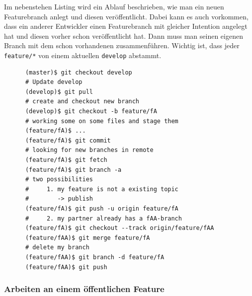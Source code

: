 \documentclass[
   draft=false
  ,paper=a4
  ,twoside=false
  ,fontsize=11pt
  ,headsepline
  ,DIV=11
  ,parskip=full+
  ,titlepage
]{scrartcl} %
\begin{document}
    
  \begin{minipage}[t]{0.25\linewidth}
	  Im nebenstehen Listing wird ein Ablauf
    beschrieben, wie man ein neuen Featurebranch anlegt und 
    diesen veröffentlicht.
    Dabei kann es auch vorkommen, dass ein anderer Entwickler einen
    Featurebranch mit gleicher Intention angelegt hat und diesen vorher 
    schon veröffentlicht hat. Dann muss man seinen eigenen Branch
    mit dem schon vorhandenen zusammenführen.
    Wichtig ist, dass jeder \texttt{feature/*} von einem aktuellen 
    \texttt{develop} abstammt. 
  \end{minipage}%
  \hfill
  \begin{minipage}[t]{0.65\linewidth}
    \begin{lstlisting}
      (master)$ git checkout develop
      # Update develop
      (develop)$ git pull
      # create and checkout new branch
      (develop)$ git checkout -b feature/fA
      # working some on some files and stage them
      (feature/fA)$ ...
      (feature/fA)$ git commit
      # looking for new branches in remote
      (feature/fA)$ git fetch
      (feature/fA)$ git branch -a
      # two possibilities
      #     1. my feature is not a existing topic
      #        -> publish
      (feature/fA)$ git push -u origin feature/fA
      #     2. my partner already has a fAA-branch
      (feature/fA)$ git checkout --track origin/feature/fAA
      (feature/fAA)$ git merge feature/fA
      # delete my branch
      (feature/fAA)$ git branch -d feature/fA
      (feature/fAA)$ git push
    \end{lstlisting}
  \end{minipage}%
    
  \subsubsection{Arbeiten an einem öffentlichen Feature}
  
\end{document}
